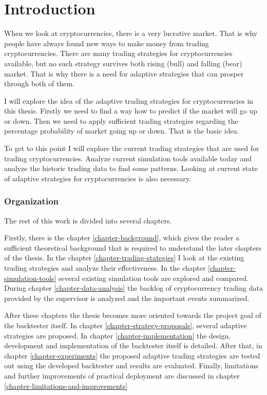 
\chapter{Introduction}

When we look at cryptocurrencies, there is a very lucrative market. That is why people have always found new ways to make money from trading cryptocurrencies. There are many trading strategies for cryptocurrencies available, but no such strategy survives both rising (bull) and falling (bear) market. That is why there is a need for adaptive strategies that can prosper through both of them.

I will explore the idea of the adaptive trading strategies for cryptocurrencies in this thesis. Firstly we need to find a way how to predict if the market will go up or down. Then we need to apply sufficient trading strategies regarding the percentage probability of market going up or down. That is the basic idea.

To get to this point I will explore the current trading strategies that are used for trading cryptocurrencies. Analyze current simulation tools available today and analyze the historic trading data to find some patterns. Looking at current state of adaptive strategies for cryptocurrencies is also necessary.

\subsection*{Organization}

The rest of this work is divided into several chapters.

Firstly, there is the chapter \ref{chapter-background}, which gives the reader a sufficient theoretical background that is required to understand the later chapters of the thesis. In the chapter \ref{chapter-trading-stategies} I look at the existing trading strategies and analyze their effectiveness. In the chapter \ref{chapter-simulation-tools} several existing simulation tools are explored and compared. During chapter \ref{chapter-data-analysis} the backlog of cryptocurrency trading data provided by the supervisor is analyzed and the important events summarized.

After these chapters the thesis becomes more oriented towards the project goal of the backtester itself. In chapter \ref{chapter-strategy-proposals}, several adaptive strategies are proposed. In chapter \ref{chapter-implementation} the design, development and implementation of the backtester itself is detailed. After that, in chapter \ref{chapter-experiments} the proposed adaptive trading strategies are tested out using the developed backtester and results are evaluated. Finally, limitations and further improvements of practical deployment are discussed in chapter \ref{chapter-limitations-and-improvements}


